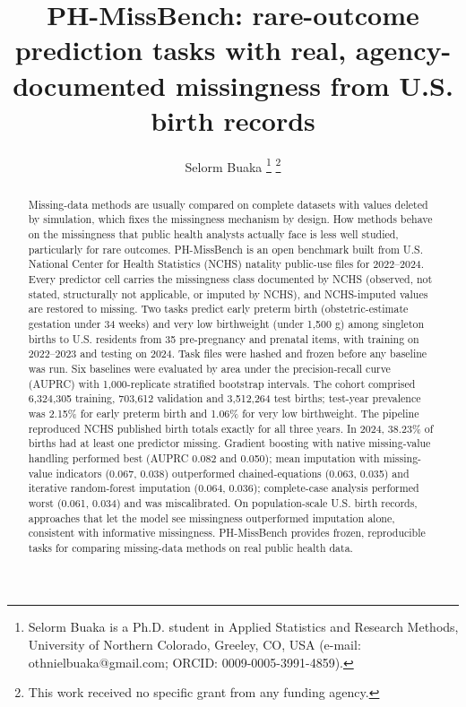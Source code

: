 \documentclass[journal]{IEEEtran}
\begin{document}
\title{PH-MissBench: rare-outcome prediction tasks with real, agency-documented missingness from U.S. birth records}

\author{Selorm Buaka%
\thanks{Selorm Buaka is a Ph.D. student in Applied Statistics and Research Methods, University of Northern Colorado, Greeley, CO, USA (e-mail: othnielbuaka@gmail.com; ORCID: 0009-0005-3991-4859).}%
\thanks{This work received no specific grant from any funding agency.}}


\maketitle

\begin{abstract}
Missing-data methods are usually compared on complete datasets with values deleted by simulation, which fixes the missingness mechanism by design. How methods behave on the missingness that public health analysts actually face is less well studied, particularly for rare outcomes. PH-MissBench is an open benchmark built from U.S. National Center for Health Statistics (NCHS) natality public-use files for 2022--2024. Every predictor cell carries the missingness class documented by NCHS (observed, not stated, structurally not applicable, or imputed by NCHS), and NCHS-imputed values are restored to missing. Two tasks predict early preterm birth (obstetric-estimate gestation under 34 weeks) and very low birthweight (under 1,500 g) among singleton births to U.S. residents from 35 pre-pregnancy and prenatal items, with training on 2022--2023 and testing on 2024. Task files were hashed and frozen before any baseline was run. Six baselines were evaluated by area under the precision-recall curve (AUPRC) with 1,000-replicate stratified bootstrap intervals. The cohort comprised 6,324,305 training, 703,612 validation and 3,512,264 test births; test-year prevalence was 2.15\% for early preterm birth and 1.06\% for very low birthweight. The pipeline reproduced NCHS published birth totals exactly for all three years. In 2024, 38.23\% of births had at least one predictor missing. Gradient boosting with native missing-value handling performed best (AUPRC 0.082 and 0.050); mean imputation with missing-value indicators (0.067, 0.038) outperformed chained-equations (0.063, 0.035) and iterative random-forest imputation (0.064, 0.036); complete-case analysis performed worst (0.061, 0.034) and was miscalibrated. On population-scale U.S. birth records, approaches that let the model see missingness outperformed imputation alone, consistent with informative missingness. PH-MissBench provides frozen, reproducible tasks for comparing missing-data methods on real public health data.
\end{abstract}
\end{document}
